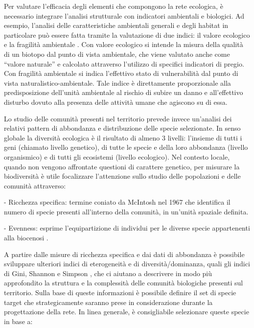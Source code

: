 \documentclass[
  a4paper,
]{book}
\begin{document}
Per valutare l'efficacia degli elementi che compongono la rete
ecologica, è necessario integrare l'analisi strutturale con indicatori
ambientali e biologici. Ad esempio, l'analisi delle caratteristiche
ambientali generali e degli habitat in particolare può essere fatta
tramite la valutazione di due indici: il valore ecologico e la fragilità
ambientale \citep{angeliniProgettoCartaNatura2009}. Con valore ecologico si
intende la misura della qualità di un biotopo dal punto di vista
ambientale, che viene valutato anche come ``valore naturale'' e calcolato
attraverso l'utilizzo di specifici indicatori di pregio. Con fragilità
ambientale si indica l'effettivo stato di vulnerabilità dal punto di
vista naturalistico-ambientale. Tale indice è direttamente proporzionale
alla predisposizione dell'unità ambientale al rischio di subire un danno
e all'effettivo disturbo dovuto alla presenza delle attività umane che
agiscono su di essa.

Lo studio delle comunità presenti nel territorio prevede invece
un'analisi dei relativi pattern di abbondanza e distribuzione delle
specie selezionate. In senso globale la diversità ecologica è il
risultato di almeno 3 livelli: l'insieme di tutti i geni (chiamato
livello genetico), di tutte le specie e della loro abbondanza (livello
organismico) e di tutti gli ecosistemi (livello ecologico). Nel contesto
locale, quando non vengono affrontate questioni di carattere genetico,
per misurare la biodiversità è utile focalizzare l'attenzione sullo
studio delle popolazioni e delle comunità attraverso:

- Ricchezza specifica: termine coniato da McIntosh nel 1967 che
identifica il numero di specie presenti all'interno della comunità, in
un'unità spaziale definita.

- Evenness: esprime l'equipartizione di individui per le diverse specie
appartenenti alla biocenosi \citep{magurranMeasuringBiologicalDiversity2004, magurranMeasuringSpeciesDiversity2011}.

A partire dalle misure di ricchezza specifica e dai dati di abbondanza è
possibile sviluppare ulteriori indici di eterogeneità e di
diversità/dominanza, quali gli indici di Gini, Shannon e Simpson
\citep{magurranMeasuringBiologicalDiversity2004}, che ci aiutano a descrivere
in modo più approfondito la struttura e la complessità delle comunità
biologiche presenti sul territorio. Sulla base di queste informazioni è
possibile definire il set di specie target che strategicamente saranno
prese in considerazione durante la progettazione della rete. In linea
generale, è consigliabile selezionare queste specie in base a:
\end{document}
